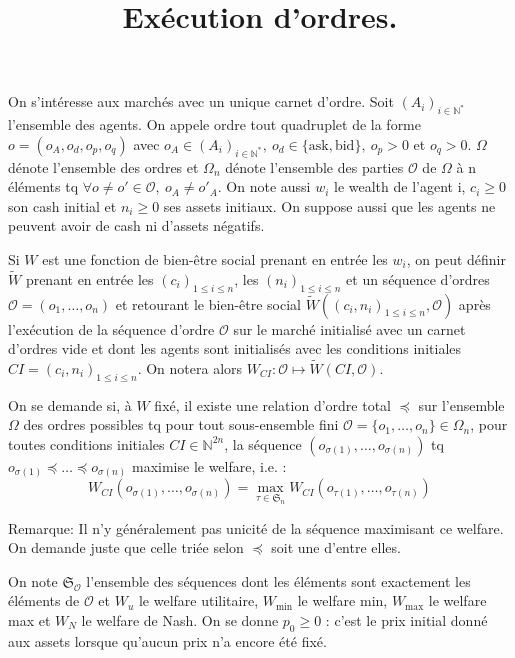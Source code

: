 \documentclass[a4paper]{article}
\title{Exécution d'ordres.}
\author{}
\date{}
\newcommand{\N}{\mathbb{N}}
\newcommand{\Sg}{\mathfrak{S}}
\newcommand{\Oc}{\mathcal{O}}
\newtheorem[style=S, bodystyle=\noindent]{thm}{Théorème}[section]
\newtheorem[style=S, bodystyle=\noindent]{defn}[thm]{Définition}
\newtheorem[style=S, bodystyle=\noindent]{propo}[thm]{Proposition}
\newtheorem[style=S, bodystyle=\noindent]{prop}[thm]{Propriété}
\newtheorem[style=S, bodystyle=\noindent]{coro}[thm]{Corollaire}
\newtheorem[style=S, bodystyle=\noindent]{lem}[thm]{Lemme}
\newtheorem[style=S, headstyle=\bfseries\boldmath Théorème, bodystyle=\noindent]{thm*}{Théorème}
\newtheorem[style=S, headstyle=\bfseries\boldmath Définition, bodystyle=\noindent]{defn*}{Définition}
\newtheorem[style=S, headstyle=\bfseries\boldmath Proposition, bodystyle=\noindent]{propo*}{Proposition}
\newtheorem[style=S, headstyle=\bfseries\boldmath Propriété, bodystyle=\noindent]{prop*}{Propriété}
\newtheorem[style=S, headstyle=\bfseries\boldmath Corollaire, bodystyle=\noindent]{coro*}{Corollaire}
\newtheorem[style=S, headstyle=\bfseries\boldmath Lemme, bodystyle=\noindent]{lem*}{Lemme}
\begin{document}
\pagestyle{fancy}
\maketitle

\paragraph{}
On s'intéresse aux marchés avec un unique carnet d'ordre. Soit $(A_i)_{i\in\N^*}$ l'ensemble des agents. On appele ordre tout quadruplet de la forme $o = (o_A, o_d, o_p, o_q)$ avec $o_A \in (A_i)_{i\in\N^*},~o_d \in \{\text{ask},\text{bid}\},~o_p>0$ et $o_q>0$. $\Omega$ dénote l'ensemble des ordres et $\Omega_n$ dénote l'ensemble des parties $\Oc$ de $\Omega$ à n éléments tq $\forall o \neq o' \in \Oc,~o_A \neq o'_A$. On note aussi $w_i$ le wealth de l'agent i, $c_i \geq 0$ son cash initial et $n_i \geq 0$ ses assets initiaux. On suppose aussi que les agents ne peuvent avoir de cash ni d'assets négatifs.

\par
Si $W$ est une fonction de bien-être social prenant en entrée les $w_i$, on peut définir $\tilde W$ prenant en entrée les $(c_i)_{1\leq i\leq n}$, les $(n_i)_{1\leq i\leq n}$ et un séquence d'ordres $\Oc = (o_1, \ldots, o_n)$ et retourant le bien-être social $\tilde W((c_i, n_i)_{1\leq i\leq n}, \Oc)$ après l'exécution de la séquence d'ordre $\Oc$ sur le marché initialisé avec un carnet d'ordres vide et dont les agents sont initialisés avec les conditions initiales $CI = (c_i, n_i)_{1\leq i\leq n}$. On notera alors $W_{CI} : \Oc \mapsto \tilde W(CI, \Oc)$.

\par
On se demande si, à $W$ fixé, il existe une relation d'ordre total $\preceq$ sur l'ensemble $\Omega$ des ordres possibles tq pour tout sous-ensemble fini $\Oc = \{o_1, \ldots, o_n\} \in \Omega_n$, pour toutes conditions initiales $CI \in \N^{2n}$, la séquence $(o_{\sigma(1)}, \ldots, o_{\sigma(n)})$ tq $o_{\sigma(1)} \preceq \ldots \preceq o_{\sigma(n)}$ maximise le welfare, i.e. : \\
\[W_{CI}(o_{\sigma(1)}, \ldots, o_{\sigma(n)}) = \max_{\tau \in \Sg_n}W_{CI}(o_{\tau(1)}, \ldots, o_{\tau(n)})\]

\par
Remarque: Il n'y généralement pas unicité de la séquence maximisant ce welfare. On demande juste que celle triée selon $\preceq$ soit une d'entre elles.

\par On note $\Sg_\Oc$ l'ensemble des séquences dont les éléments sont exactement les éléments de $\Oc$ et $W_u$ le welfare utilitaire, $W_{\min}$ le welfare min, $W_{\max}$ le welfare max et $W_N$ le welfare de Nash. On se donne $p_0 \geq 0$ : c'est le prix initial donné aux assets lorsque qu'aucun prix n'a encore été fixé.
\end{document}

